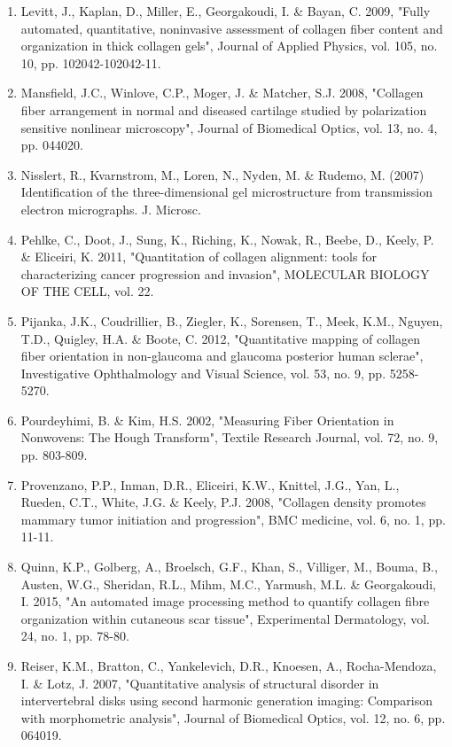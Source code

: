\documentclass[12pt,a4paper]{article}
\begin{document}
\begin{enumerate}
\item Levitt, J., Kaplan, D., Miller, E., Georgakoudi, I. \& Bayan, C. 2009, "Fully automated, quantitative, noninvasive assessment of collagen fiber content and organization in thick collagen gels", Journal of Applied Physics, vol. 105, no. 10, pp. 102042-102042-11.
\item Mansfield, J.C., Winlove, C.P., Moger, J. \& Matcher, S.J. 2008, "Collagen fiber arrangement in normal and diseased cartilage studied by polarization sensitive nonlinear microscopy", Journal of Biomedical Optics, vol. 13, no. 4, pp. 044020.
\item Nisslert, R., Kvarnstrom, M., Loren, N., Nyden, M. \& Rudemo, M. (2007) Identification of the three-dimensional gel microstructure from transmission electron micrographs. J. Microsc.
\item Pehlke, C., Doot, J., Sung, K., Riching, K., Nowak, R., Beebe, D., Keely, P. \& Eliceiri, K. 2011, "Quantitation of collagen alignment: tools for characterizing cancer progression and invasion", MOLECULAR BIOLOGY OF THE CELL, vol. 22.
\item Pijanka, J.K., Coudrillier, B., Ziegler, K., Sorensen, T., Meek, K.M., Nguyen, T.D., Quigley, H.A. \& Boote, C. 2012, "Quantitative mapping of collagen fiber orientation in non-glaucoma and glaucoma posterior human sclerae", Investigative Ophthalmology and Visual Science, vol. 53, no. 9, pp. 5258-5270.
\item Pourdeyhimi, B. \& Kim, H.S. 2002, "Measuring Fiber Orientation in Nonwovens: The Hough Transform", Textile Research Journal, vol. 72, no. 9, pp. 803-809.
\item Provenzano, P.P., Inman, D.R., Eliceiri, K.W., Knittel, J.G., Yan, L., Rueden, C.T., White, J.G. \& Keely, P.J. 2008, "Collagen density promotes mammary tumor initiation and progression", BMC medicine, vol. 6, no. 1, pp. 11-11.
\item Quinn, K.P., Golberg, A., Broelsch, G.F., Khan, S., Villiger, M., Bouma, B., Austen, W.G., Sheridan, R.L., Mihm, M.C., Yarmush, M.L. \& Georgakoudi, I. 2015, "An automated image processing method to quantify collagen fibre organization within cutaneous scar tissue", Experimental Dermatology, vol. 24, no. 1, pp. 78-80.
\item Reiser, K.M., Bratton, C., Yankelevich, D.R., Knoesen, A., Rocha-Mendoza, I. \& Lotz, J. 2007, "Quantitative analysis of structural disorder in intervertebral disks using second harmonic generation imaging: Comparison with morphometric analysis", Journal of Biomedical Optics, vol. 12, no. 6, pp. 064019.

\end{enumerate}
\end{document}
